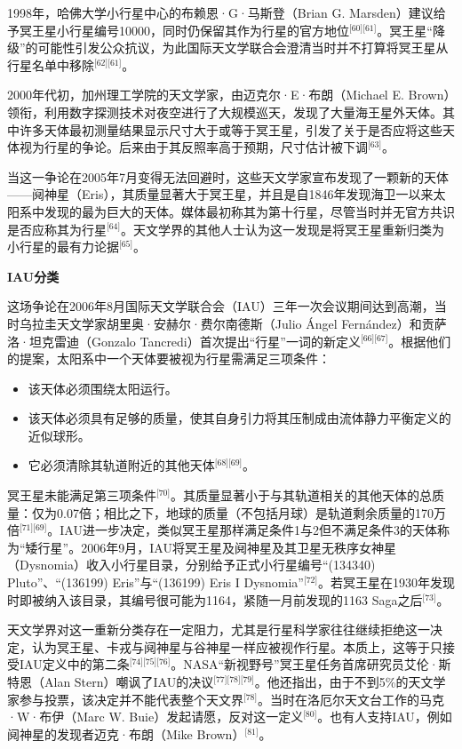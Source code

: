 1998年，哈佛大学小行星中心的布赖恩·G·马斯登（Brian G. Marsden）建议给予冥王星小行星编号10000，同时仍保留其作为行星的官方地位\(^\text{[60][61]}\)。冥王星“降级”的可能性引发公众抗议，为此国际天文学联合会澄清当时并不打算将冥王星从行星名单中移除\(^\text{[62][61]}\)。

2000年代初，加州理工学院的天文学家，由迈克尔·E·布朗（Michael E. Brown）领衔，利用数字探测技术对夜空进行了大规模巡天，发现了大量海王星外天体。其中许多天体最初测量结果显示尺寸大于或等于冥王星，引发了关于是否应将这些天体视为行星的争论。后来由于其反照率高于预期，尺寸估计被下调\(^\text{[63]}\)。

当这一争论在2005年7月变得无法回避时，这些天文学家宣布发现了一颗新的天体——阋神星（Eris），其质量显著大于冥王星，并且是自1846年发现海卫一以来太阳系中发现的最为巨大的天体。媒体最初称其为第十行星，尽管当时并无官方共识是否应称其为行星\(^\text{[64]}\)。天文学界的其他人士认为这一发现是将冥王星重新归类为小行星的最有力论据\(^\text{[65]}\)。

\textbf{IAU分类}

这场争论在2006年8月国际天文学联合会（IAU）三年一次会议期间达到高潮，当时乌拉圭天文学家胡里奥·安赫尔·费尔南德斯（Julio Ángel Fernández）和贡萨洛·坦克雷迪（Gonzalo Tancredi）首次提出“行星”一词的新定义\(^\text{[66][67]}\)。根据他们的提案，太阳系中一个天体要被视为行星需满足三项条件：
\begin{itemize}
\item 该天体必须围绕太阳运行。
\item 该天体必须具有足够的质量，使其自身引力将其压制成由流体静力平衡定义的近似球形。
\item 它必须清除其轨道附近的其他天体\(^\text{[68][69]}\)。
\end{itemize}
冥王星未能满足第三项条件\(^\text{[70]}\)。其质量显著小于与其轨道相关的其他天体的总质量：仅为0.07倍；相比之下，地球的质量（不包括月球）是轨道剩余质量的170万倍\(^\text{[71][69]}\)。IAU进一步决定，类似冥王星那样满足条件1与2但不满足条件3的天体称为“矮行星”。2006年9月，IAU将冥王星及阋神星及其卫星无秩序女神星（Dysnomia）收入小行星目录，分别给予正式小行星编号“(134340) Pluto”、“(136199) Eris”与“(136199) Eris I Dysnomia”\(^\text{[72]}\)。若冥王星在1930年发现时即被纳入该目录，其编号很可能为1164，紧随一月前发现的1163 Saga之后\(^\text{[73]}\)。

天文学界对这一重新分类存在一定阻力，尤其是行星科学家往往继续拒绝这一决定，认为冥王星、卡戎与阋神星与谷神星一样应被视作行星。本质上，这等于只接受IAU定义中的第二条\(^\text{[74][75][76]}\)。NASA“新视野号”冥王星任务首席研究员艾伦·斯特恩（Alan Stern）嘲讽了IAU的决议\(^\text{[77][78][79]}\)。他还指出，由于不到5\%的天文学家参与投票，该决定并不能代表整个天文界\(^\text{[78]}\)。当时在洛厄尔天文台工作的马克·W·布伊（Marc W. Buie）发起请愿，反对这一定义\(^\text{[80]}\)。也有人支持IAU，例如阋神星的发现者迈克·布朗（Mike Brown）\(^\text{[81]}\)。

